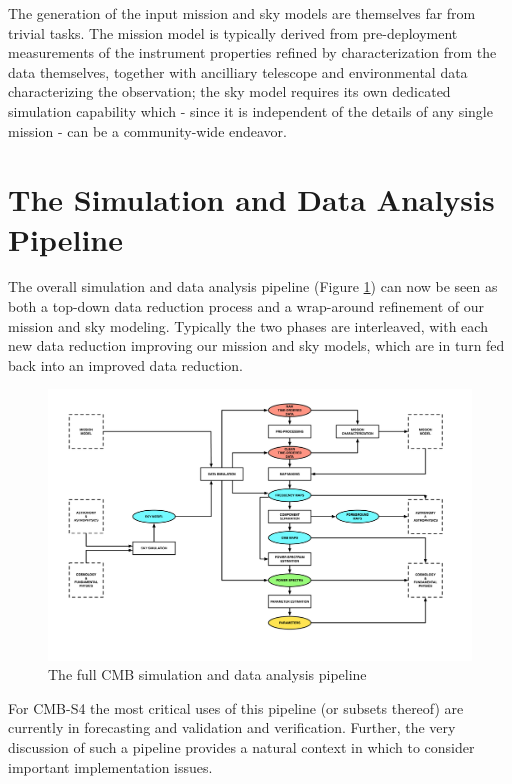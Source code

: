 The generation of the input mission and sky models are themselves far from trivial tasks. The mission model is typically derived from pre-deployment measurements of the instrument properties refined by characterization from the data themselves, together with ancilliary telescope and environmental data characterizing the observation; the sky model requires its own dedicated simulation capability which - since it is independent of the details of any single mission - can be a community-wide endeavor.

\newpage



\newpage



\newpage

\section{The Simulation and Data Analysis Pipeline}

The overall simulation and data analysis pipeline (Figure \ref{fig_simda}) can now be seen as both a top-down data reduction process and a wrap-around refinement of our mission and sky modeling. Typically the two phases are interleaved, with each new data reduction improving our mission and sky models, which are in turn fed back into an improved data reduction.

\begin{figure}[htbp]
\includegraphics[width=1\textwidth]{Analysis/simda}
\caption{The full CMB simulation and data analysis pipeline}
\label{fig_simda}
\end{figure}

For CMB-S4 the most critical uses of this pipeline (or subsets thereof) are currently in forecasting and validation and verification. Further, the very discussion of such a pipeline provides a natural context in which to consider important implementation issues.

